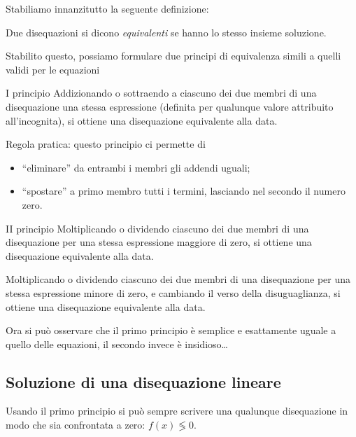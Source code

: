 Stabiliamo innanzitutto la seguente definizione:

\begin{definizione}{}{}
Due disequazioni si dicono \emph{equivalenti} se hanno lo
stesso insieme soluzione.
\end{definizione}

Stabilito questo, possiamo formulare due principi di equivalenza
simili a quelli validi per le equazioni

\begin{teorema}{I principio}{}
\label{ppd}
Addizionando o sottraendo a ciascuno dei due membri di
una disequazione una stessa espressione (definita per qualunque
valore attribuito all'incognita), si ottiene una
disequazione equivalente alla data.
\end{teorema}

Regola pratica: questo principio ci permette di
\begin{itemize} [nosep]
\item ``eliminare'' da entrambi i membri gli addendi uguali;
\item ``spostare'' a primo membro tutti i termini, lasciando nel secondo il 
numero zero.
\end{itemize}

\begin{teorema}{II principio}{}
Moltiplicando o dividendo ciascuno dei due membri di
una disequazione per una stessa espressione maggiore di zero, 
si ottiene una disequazione equivalente alla data.

Moltiplicando o dividendo ciascuno dei due membri di
una disequazione per una stessa espressione minore di zero, 
e cambiando il verso della disuguaglianza,
si ottiene una disequazione equivalente alla data.
\end{teorema}

Ora si può osservare che il primo principio è semplice e esattamente 
uguale a quello delle equazioni, il secondo invece è insidioso\dots 

\subsection{Soluzione di una disequazione lineare}
Usando il primo principio si può sempre scrivere una qualunque disequazione 
in modo che sia confrontata a zero: \(f(x) \lessgtr 0\). 

